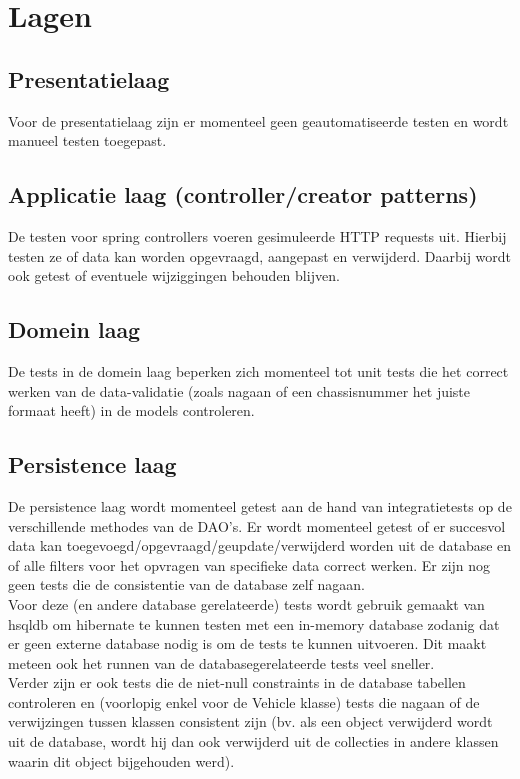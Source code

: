 \documentclass{article}
\begin{document}


\section{Lagen}
\subsection{Presentatielaag}
Voor de presentatielaag zijn er momenteel geen geautomatiseerde testen en wordt manueel testen toegepast.

\subsection{Applicatie laag (controller/creator patterns)}
De testen voor spring controllers voeren gesimuleerde HTTP requests uit. Hierbij testen ze of data kan worden opgevraagd, aangepast en verwijderd. Daarbij wordt ook getest of eventuele wijziggingen behouden blijven.

\subsection{Domein laag}
De tests in de domein laag beperken zich momenteel tot unit tests die het correct werken van de data-validatie (zoals nagaan of een chassisnummer het juiste formaat heeft) in de models controleren.

\subsection{Persistence laag}
De persistence laag wordt momenteel getest aan de hand van integratietests op de verschillende methodes van de DAO's. Er wordt momenteel getest of er succesvol data kan toegevoegd/opgevraagd/geupdate/verwijderd worden uit de database en of alle filters voor het opvragen van specifieke data correct werken. Er zijn nog geen tests die de consistentie van de database zelf nagaan.\\
Voor deze (en andere database gerelateerde) tests wordt gebruik gemaakt van hsqldb om hibernate te kunnen testen met een in-memory database zodanig dat er geen externe database nodig is om de tests te kunnen uitvoeren. Dit maakt meteen ook het runnen van de databasegerelateerde tests veel sneller. \\

Verder zijn er ook tests die de niet-null constraints in de database tabellen controleren en (voorlopig enkel voor de Vehicle klasse) tests die nagaan of de verwijzingen tussen klassen consistent zijn (bv. als een object verwijderd wordt uit de database, wordt hij dan ook verwijderd uit de collecties in andere klassen waarin dit object bijgehouden werd).\\
\end{document}
